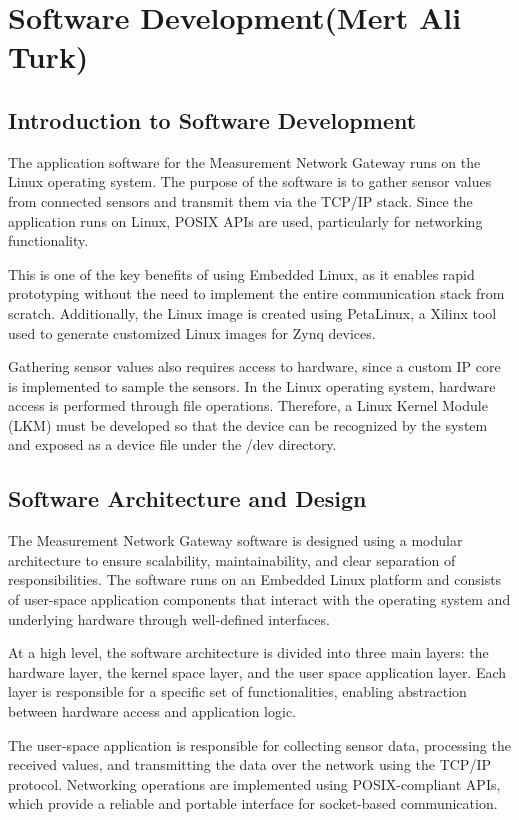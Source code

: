 \section{Software Development(Mert Ali Turk)}

\subsection{Introduction to Software Development}
The application software for the Measurement Network Gateway runs on the Linux operating 
system. The purpose of the software is to gather sensor values from connected sensors 
and transmit them via the TCP/IP stack. Since the application runs on Linux, POSIX APIs 
are used, particularly for networking functionality.

This is one of the key benefits of using Embedded Linux, as it enables rapid prototyping 
without the need to implement the entire communication stack from scratch. Additionally, 
the Linux image is created using PetaLinux, a Xilinx tool used to generate customized 
Linux images for Zynq devices.

Gathering sensor values also requires access to hardware, since a custom IP core 
is implemented to sample the sensors. In the Linux operating system, hardware access 
is performed through file operations. Therefore, a Linux Kernel Module (LKM) must be 
developed so that the device can be recognized by the system and exposed as a device
file under the /dev directory.

\subsection{Software Architecture and Design}

The Measurement Network Gateway software is designed using a modular architecture to ensure scalability, maintainability, and clear separation of responsibilities. The software runs on an Embedded Linux platform and consists of user-space application components that interact with the operating system and underlying hardware through well-defined interfaces.

At a high level, the software architecture is divided into three main layers: the hardware layer, the kernel space layer, and the user space application layer. Each layer is responsible for a specific set of functionalities, enabling abstraction between hardware access and application logic.

The user-space application is responsible for collecting sensor data, processing the received values, and transmitting the data over the network using the TCP/IP protocol. Networking operations are implemented using POSIX-compliant APIs, which provide a reliable and portable interface for socket-based communication.

